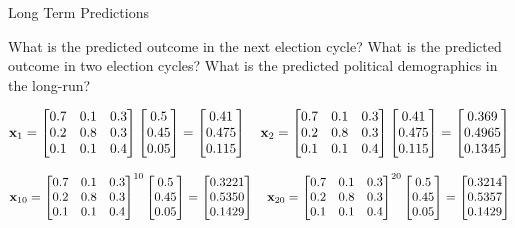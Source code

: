 \documentclass[xcolor=dvipsnames,aspectratio=169,t]{beamer}
\begin{document}
\begin{frame}{Long Term Predictions}

\bb
\ii What is the predicted outcome in the next election cycle? 
\ii What is the predicted outcome in two election cycles?
\ii What is the predicted political demographics in the long-run?
\ee

\pause
{\small
\[ \mathbf{x}_1 =  \begin{bmatrix}
0.7 & 0.1 & 0.3 \\
0.2 & 0.8 & 0.3 \\
0.1 & 0.1 & 0.4 \end{bmatrix} \begin{bmatrix} 0.5 \\ 0.45 \\ 0.05 \end{bmatrix}  = 
\begin{bmatrix} 0.41 \\ 0.475 \\ 0.115 \end{bmatrix} \quad
 \mathbf{x}_2 =   \begin{bmatrix}
0.7 & 0.1 & 0.3 \\
0.2 & 0.8 & 0.3 \\
0.1 & 0.1 & 0.4 \end{bmatrix} \begin{bmatrix} 0.41 \\ 0.475 \\ 0.115 \end{bmatrix} = 
\begin{bmatrix} 0.369 \\ 0.4965 \\ 0.1345 \end{bmatrix} \] }

\vspace{-0.1in}

\pause
{\small 
\[ \mathbf{x}_{10} =  \begin{bmatrix}
0.7 & 0.1 & 0.3 \\
0.2 & 0.8 & 0.3 \\
0.1 & 0.1 & 0.4 \end{bmatrix}^{10} \begin{bmatrix} 0.5 \\ 0.45 \\ 0.05 \end{bmatrix} = 
\begin{bmatrix} 0.3221 \\ 0.5350 \\ 0.1429  \end{bmatrix} \quad
 \mathbf{x}_{20} =  \begin{bmatrix}
0.7 & 0.1 & 0.3 \\
0.2 & 0.8 & 0.3 \\
0.1 & 0.1 & 0.4 \end{bmatrix}^{20} \begin{bmatrix} 0.5 \\ 0.45 \\ 0.05 \end{bmatrix} = 
\begin{bmatrix} 0.3214 \\ 0.5357  \\ 0.1429 \end{bmatrix} \] }


\end{frame}
\end{document}
